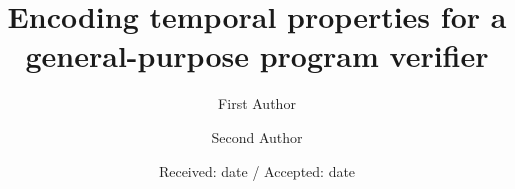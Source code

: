 \title{Encoding temporal properties for a general-purpose program verifier%
}


\author{First Author         \and
        Second Author %
}



\date{Received: date / Accepted: date}


\maketitle

